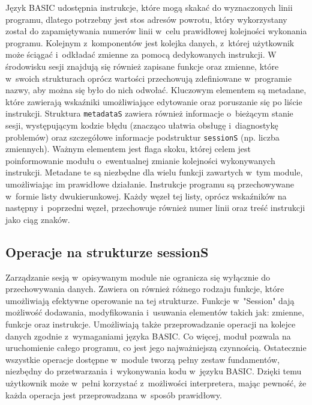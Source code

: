 \documentclass[shortabstract]{iithesis}
\begin{document}
Język BASIC udostępnia instrukcje, które mogą skakać do wyznaczonych linii programu, dlatego potrzebny jest stos adresów powrotu, który wykorzystany został do zapamiętywania numerów linii w~celu prawidłowej kolejności wykonania programu. Kolejnym z~komponentów jest kolejka danych, z~której użytkownik może ściągać i~odkładać zmienne za pomocą dedykowanych instrukcji. W środowisku sesji znajdują się również zapisane funkcje oraz zmienne, które w~swoich strukturach oprócz wartości przechowują zdefiniowane w~programie nazwy, aby można się było do nich odwołać. Kluczowym elementem są metadane, które zawierają wskaźniki umożliwiające edytowanie oraz poruszanie się po liście instrukcji. Struktura \texttt{metadataS} zawiera również informacje o~bieżącym stanie sesji, występującym kodzie błędu (znacząco ułatwia obsługę i~diagnostykę problemów) oraz szczegółowe informacje podstruktur \texttt{sessionS} (np. liczba zmiennych). Ważnym elementem jest flaga skoku, której celem jest poinformowanie modułu o~ewentualnej zmianie kolejności wykonywanych instrukcji. Metadane te są niezbędne dla wielu funkcji zawartych w~tym module, umożliwiając im prawidłowe działanie.
Instrukcje programu są przechowywane w~formie listy dwukierunkowej. Każdy węzeł tej listy, oprócz wskaźników na następny i~poprzedni węzeł, przechowuje również numer linii oraz treść instrukcji jako ciąg znaków.
\subsection{Operacje na strukturze sessionS}
Zarządzanie sesją w~opisywanym module nie ogranicza się wyłącznie do przechowywania danych. Zawiera on również różnego rodzaju funkcje, które umożliwiają efektywne operowanie na tej strukturze. Funkcje w~"Session" dają możliwość dodawania, modyfikowania i~usuwania elementów takich jak: zmienne, funkcje oraz instrukcje. Umożliwiają także przeprowadzanie operacji na kolejce danych zgodnie z~wymaganiami języka BASIC. Co więcej, moduł pozwala na uruchomienie całego programu, co jest jego najważniejszą czynnością. Ostatecznie wszystkie operacje dostępne w~module tworzą pełny zestaw fundamentów, niezbędny do przetwarzania i~wykonywania kodu w~języku BASIC. Dzięki temu użytkownik może w~pełni korzystać z~możliwości interpretera, mając pewność, że każda operacja jest przeprowadzana w~sposób prawidłowy.
\end{document}
